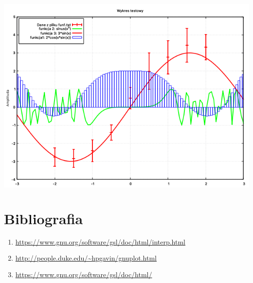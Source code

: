 \documentclass[5]{article}
\begin{document}
\begin{center}
    \includegraphics[scale=0.7]{zad4.png} \par
    \vspace{3mm}
    
\end{center}



\section{Bibliografia}

\begin{enumerate}
  \item \url{https://www.gnu.org/software/gsl/doc/html/interp.html}
  \item \url{http://people.duke.edu/~hpgavin/gnuplot.html}
  \item \url{https://www.gnu.org/software/gsl/doc/html/}
\end{enumerate}
\end{document}
